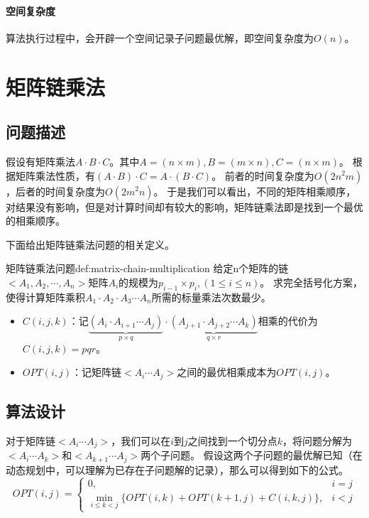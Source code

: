 \paragraph*{空间复杂度}
算法执行过程中，会开辟一个空间记录子问题最优解，即空间复杂度为$O(n)$。

\section{矩阵链乘法} \label{sec:matrix-chain-multiplication}

\subsection{问题描述}
假设有矩阵乘法$A \cdot B \cdot C$。其中$A = (n \times m), B = (m \times n), C = (n \times m)$。
根据矩阵乘法性质，有$(A \cdot B) \cdot C = A \cdot (B \cdot C)$。
前者的时间复杂度为$O(2n^2m)$，后者的时间复杂度为$O(2m^2n)$。
于是我们可以看出，不同的矩阵相乘顺序，对结果没有影响，但是对计算时间却有较大的影响，矩阵链乘法即是找到一个最优的相乘顺序。
\par
下面给出矩阵链乘法问题的相关定义。
\begin{definition}{矩阵链乘法问题}{def:matrix-chain-multiplication}
  给定n个矩阵的链$<A_1,A_2,\cdots,A_n>$矩阵$A_i$的规模为$p_{i-1} \times p_i, (1 \leq i \leq n)$。
  求完全括号化方案，使得计算矩阵乘积$A_1 \cdot A_2 \cdot A_3 \cdots A_n$所需的标量乘法次数最少。
  \begin{itemize}
    \item $C(i,j,k)$：记$\underbrace{(A_i \cdot A_{i+1} \cdots A_j)}_{p \times q}  \cdot \underbrace{(A_{j+1} \cdot A_{j+2} \cdots A_k)}_{q \times r}$相乘的代价为$C(i,j,k)=pqr$。
    \item $OPT(i,j)$：记矩阵链$<A_i \cdots A_j>$之间的最优相乘成本为$OPT(i,j)$。
  \end{itemize}
\end{definition}

\subsection{算法设计}
对于矩阵链$<A_i \cdots A_j>$，我们可以在$i$到$j$之间找到一个切分点$k$，将问题分解为$<A_i \cdots A_k>$和$<A_{k+1} \cdots A_j>$两个子问题。
假设这两个子问题的最优解已知（在动态规划中，可以理解为已存在子问题解的记录），那么可以得到如下的公式。
\begin{equation}
  OPT(i,j) = \begin{cases}
    0,                                                            & i = j \\
    \min\limits_{i \leq k < j} \{ OPT(i,k)+OPT(k+1,j)+C(i,k,j)\}, & i < j
  \end{cases}
\end{equation}

